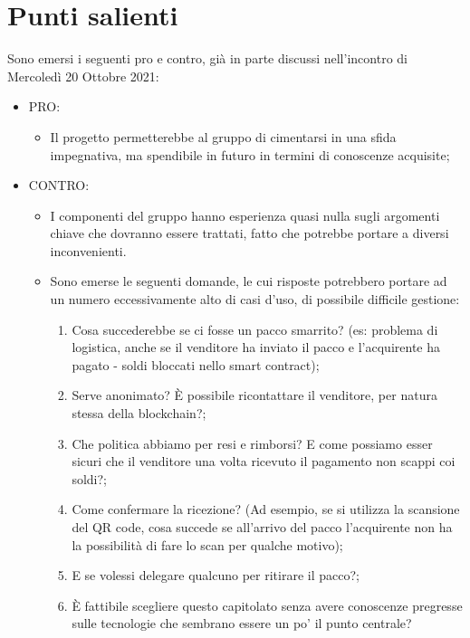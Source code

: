 \documentclass[11pt]{article}
\begin{document}
	\section{Punti salienti}
		Sono emersi i seguenti pro e contro, già in parte discussi nell'incontro di Mercoledì 20 Ottobre 2021:
		\begin{itemize}
			\item PRO:
			\begin{itemize}
				\item Il progetto permetterebbe al gruppo di cimentarsi in una sfida impegnativa, ma spendibile in futuro
				in termini di conoscenze acquisite;
			\end{itemize}
			\item CONTRO:
				\begin{itemize}
				\item I componenti del gruppo hanno esperienza quasi nulla sugli argomenti chiave che dovranno essere
				trattati, fatto che potrebbe portare a diversi inconvenienti.
				\item Sono emerse le seguenti domande, le cui risposte potrebbero portare ad un numero eccessivamente
				alto di casi d'uso, di possibile difficile gestione:
				\begin{enumerate}
					\item Cosa succederebbe se ci fosse un pacco smarrito? (es: problema di logistica, anche se il venditore
					ha inviato il pacco e l'acquirente ha pagato - soldi bloccati nello smart contract);
					\item Serve anonimato? È possibile ricontattare il venditore, per natura stessa della blockchain?;
					\item Che politica abbiamo per resi e rimborsi? E come possiamo esser sicuri che il venditore una volta
					ricevuto il pagamento non scappi coi soldi?;
					\item Come confermare la ricezione? (Ad esempio, se si utilizza la scansione del QR code, cosa succede
					se all'arrivo del pacco l'acquirente non ha la possibilità di fare lo scan per qualche motivo);
					\item E se volessi delegare qualcuno per ritirare il pacco?;
					\item È fattibile scegliere questo capitolato senza avere conoscenze pregresse sulle tecnologie che
					sembrano essere un po' il punto centrale?
				\end{enumerate}
			\end{itemize}
		\end{itemize}
\end{document}
